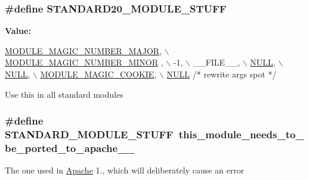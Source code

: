 \subsubsection[{\texorpdfstring{S\+T\+A\+N\+D\+A\+R\+D20\+\_\+\+M\+O\+D\+U\+L\+E\+\_\+\+S\+T\+U\+FF}{STANDARD20_MODULE_STUFF}}]{\setlength{\rightskip}{0pt plus 5cm}\#define S\+T\+A\+N\+D\+A\+R\+D20\+\_\+\+M\+O\+D\+U\+L\+E\+\_\+\+S\+T\+U\+FF}\hypertarget{group__ModuleInit_ga852c139212175cbc1e47a608a198da13}{}\label{group__ModuleInit_ga852c139212175cbc1e47a608a198da13}
{\bfseries Value\+:}
\begin{DoxyCode}
\hyperlink{group__APACHE__CORE__MMN_ga317b5a0001d505331fafd3864636c2ad}{MODULE\_MAGIC\_NUMBER\_MAJOR}, \hyperlink{group__APACHE__CORE__MMN_ga588f30a3c70ecc64ad0db18393cc34f2}{\(\backslash\)}
\hyperlink{group__APACHE__CORE__MMN_ga588f30a3c70ecc64ad0db18393cc34f2}{                                MODULE\_MAGIC\_NUMBER\_MINOR}
      , \(\backslash\)
                                -1, \(\backslash\)
                                \_\_FILE\_\_, \hyperlink{pcre_8txt_ad7f989d16aa8ca809a36bc392c07fba1}{\(\backslash\)}
\hyperlink{pcre_8txt_ad7f989d16aa8ca809a36bc392c07fba1}{                                NULL}, \hyperlink{pcre_8txt_ad7f989d16aa8ca809a36bc392c07fba1}{\(\backslash\)}
\hyperlink{pcre_8txt_ad7f989d16aa8ca809a36bc392c07fba1}{                                NULL}, \hyperlink{group__APACHE__CORE__MMN_ga2c4ca3863cb05770bbe7d6a795bcaa3e}{\(\backslash\)}
\hyperlink{group__APACHE__CORE__MMN_ga2c4ca3863cb05770bbe7d6a795bcaa3e}{                                MODULE\_MAGIC\_COOKIE}, 
      \hyperlink{pcre_8txt_ad7f989d16aa8ca809a36bc392c07fba1}{\(\backslash\)}
\hyperlink{pcre_8txt_ad7f989d16aa8ca809a36bc392c07fba1}{                                NULL}      \textcolor{comment}{/* rewrite args spot */}
\end{DoxyCode}
Use this in all standard modules 
\subsubsection[{\texorpdfstring{S\+T\+A\+N\+D\+A\+R\+D\+\_\+\+M\+O\+D\+U\+L\+E\+\_\+\+S\+T\+U\+FF}{STANDARD_MODULE_STUFF}}]{\setlength{\rightskip}{0pt plus 5cm}\#define S\+T\+A\+N\+D\+A\+R\+D\+\_\+\+M\+O\+D\+U\+L\+E\+\_\+\+S\+T\+U\+FF~this\+\_\+module\+\_\+needs\+\_\+to\+\_\+be\+\_\+ported\+\_\+to\+\_\+apache\+\_\+\_}\hypertarget{group__ModuleInit_gad732770e2b297b8a12d91a2d636d420c}{}\label{group__ModuleInit_gad732770e2b297b8a12d91a2d636d420c}
The one used in \hyperlink{namespaceApache}{Apache} 1., which will deliberately cause an error 